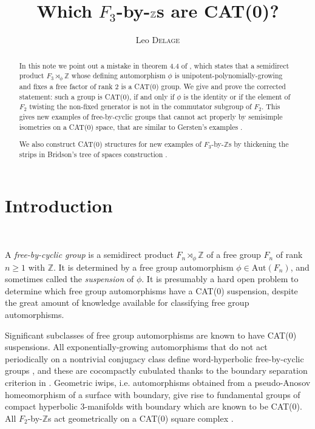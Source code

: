 \documentclass  [a4paper, 11pts] {article}
\title{Which $F_3$-by-$\Z$s are CAT(0)?}
\author{Leo \textsc{Delage}}
\date{}
\newcommand{\Z}{\mathbb{Z}}
\newcommand{\Aut}{{\mathrm{Aut}}}
\begin{document}
\maketitle

\begin{abstract}

In this note we point out a mistake in theorem 4.4 of \cite{Sam06}, which states that a semidirect product $F_3\rtimes_\phi\Z$ whose defining automorphism $\phi$ is unipotent-polynomially-growing and fixes a free factor of rank $2$ is a CAT(0) group. We give and prove the corrected statement: such a group is CAT(0), if and only if $\phi$ is the identity or if the element of $F_2$ twisting the non-fixed generator is not in the commutator subgroup of $F_2$. This gives new examples of free-by-cyclic groups that cannot act properly by semisimple isometries on a CAT(0) space, that are similar to {Gersten}'s examples \cite{Ger94}.

We also construct CAT(0) structures for new examples of $F_3$-by-$\Z$s by thickening the strips in {Bridson}'s tree of spaces construction \cite{BH99}.

\end{abstract}

\section{Introduction} ~

A \emph{free-by-cyclic group} is a semidirect product $F_n\rtimes_\phi\Z$ of a free group $F_n$ of rank $n\ge 1$ with $\Z$. It is determined by a free group automorphism $\phi\in \Aut(F_n)$, and sometimes called the \emph{suspension} of $\phi$. It is presumably a hard open problem to determine which free group automorphisms have a CAT(0) suspension, despite the great amount of knowledge available for classifying free group automorphisms.

Significant subclasses of free group automorphisms are known to have CAT(0) suspensions.
All exponentially-growing automorphisms that do not act periodically on a nontrivial conjugacy class define word-hyperbolic free-by-cyclic groups \cite{BF92, Bri00}, and these are cocompactly cubulated thanks to the boundary separation criterion in \cite{BW12, HW15}. Geometric iwips, i.e. automorphisms obtained from a pseudo-Anosov homeomorphism of a surface with boundary, give rise to fundamental groups of compact hyperbolic $3$-manifolds with boundary \cite{Ota96} which are known to be CAT(0). All $F_2$-by-$\Z$s act geometrically on a CAT(0) square complex \cite{BK16}.
\end{document}
